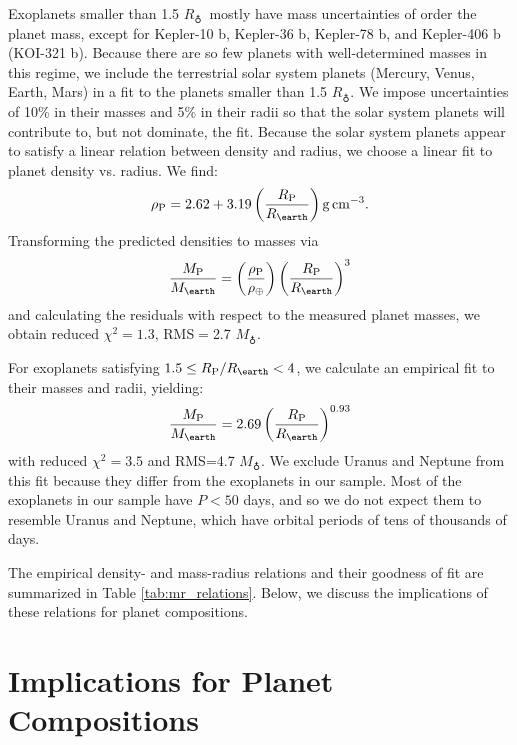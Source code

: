 \documentclass[iop]{emulateapj}
\newcommand{\gcmc}{\ensuremath{\rm g\,cm^{-3}}}
\newcommand{\gcc}{\gcmc}
\newcommand{\rpl}{\ensuremath{R_{\rm P}}}
\newcommand{\mpl}{\ensuremath{M_{\rm P}}}
\newcommand{\rhopl}{\ensuremath{\rho_{\rm P}}}
\newcommand{\rearth}{\ensuremath{R_\earth}}
\newcommand{\mearth}{\ensuremath{M_\earth}}
\begin{document}
Exoplanets smaller than 1.5 \rearth\ mostly have mass uncertainties of order the planet mass, except for Kepler-10 b, Kepler-36 b, Kepler-78 b, and Kepler-406 b (KOI-321 b).  Because there are so few planets with well-determined masses in this regime, we include the terrestrial solar system planets (Mercury, Venus, Earth, Mars) in a fit to the planets smaller than 1.5 \rearth.  We impose uncertainties of 10\% in their masses and 5\% in their radii so that the solar system planets will contribute to, but not dominate, the fit.  Because the solar system planets appear to satisfy a linear relation between density and radius, we choose a linear fit to planet density vs. radius.  We find:
\begin{equation}
\rhopl = 2.62 + 3.19 \left(\frac{\rpl}{\rearth}\right) \gcc.
\label{eqn:dr_lin_rocky}
\end{equation}
Transforming the predicted densities to masses via 
\begin{equation}
\frac{\mpl}{\mearth} = \left(\frac{\rhopl}{\rho_\oplus}\right) \left(\frac{\rpl}{\rearth}\right)^3
\end{equation}
and calculating the residuals with respect to the measured planet masses, we obtain reduced $\chi^2 = 1.3$, RMS$=$2.7 \mearth.

For exoplanets satisfying $1.5 \le \rpl/\rearth < 4$, we calculate an empirical fit to their masses and radii, yielding:
\begin{equation}
\frac{\mpl}{\mearth} = 2.69 \left(\frac{\rpl}{\rearth}\right)^{0.93}
\label{eqn:mr_plaw}
\end{equation}
with reduced $\chi^2=3.5$ and RMS=4.7 \mearth.  We exclude Uranus and Neptune from this fit because they differ from the exoplanets in our sample.  Most of the exoplanets in our sample have $P < 50$ days, and so we do not expect them to resemble Uranus and Neptune, which have orbital periods of tens of thousands of days.

The empirical density- and mass-radius relations and their goodness of fit are summarized in Table \ref{tab:mr_relations}.  Below, we discuss the implications of these relations for planet compositions.


\section{Implications for Planet Compositions}
	
\end{document}
